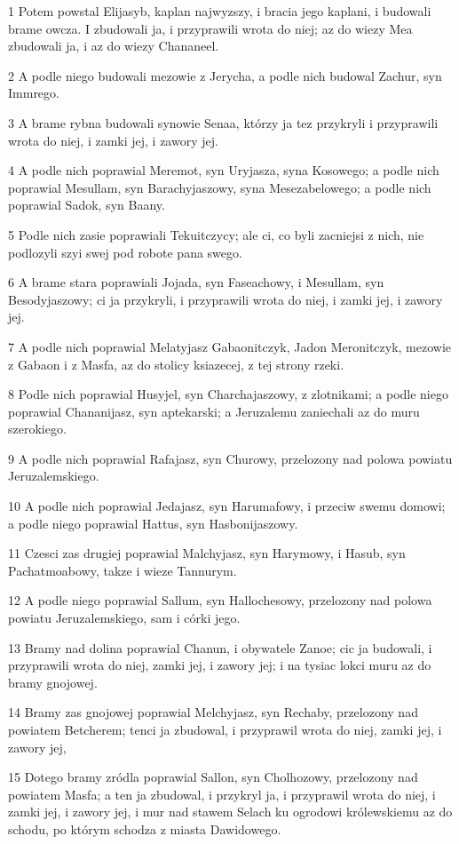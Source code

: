 \par 1 Potem powstal Elijasyb, kaplan najwyzszy, i bracia jego kaplani, i budowali brame owcza. I zbudowali ja, i przyprawili wrota do niej; az do wiezy Mea zbudowali ja, i az do wiezy Chananeel.
\par 2 A podle niego budowali mezowie z Jerycha, a podle nich budowal Zachur, syn Immrego.
\par 3 A brame rybna budowali synowie Senaa, którzy ja tez przykryli i przyprawili wrota do niej, i zamki jej, i zawory jej.
\par 4 A podle nich poprawial Meremot, syn Uryjasza, syna Kosowego; a podle nich poprawial Mesullam, syn Barachyjaszowy, syna Mesezabelowego; a podle nich poprawial Sadok, syn Baany.
\par 5 Podle nich zasie poprawiali Tekuitczycy; ale ci, co byli zacniejsi z nich, nie podlozyli szyi swej pod robote pana swego.
\par 6 A brame stara poprawiali Jojada, syn Faseachowy, i Mesullam, syn Besodyjaszowy; ci ja przykryli, i przyprawili wrota do niej, i zamki jej, i zawory jej.
\par 7 A podle nich poprawial Melatyjasz Gabaonitczyk, Jadon Meronitczyk, mezowie z Gabaon i z Masfa, az do stolicy ksiazecej, z tej strony rzeki.
\par 8 Podle nich poprawial Husyjel, syn Charchajaszowy, z zlotnikami; a podle niego poprawial Chananijasz, syn aptekarski; a Jeruzalemu zaniechali az do muru szerokiego.
\par 9 A podle nich poprawial Rafajasz, syn Churowy, przelozony nad polowa powiatu Jeruzalemskiego.
\par 10 A podle nich poprawial Jedajasz, syn Harumafowy, i przeciw swemu domowi; a podle niego poprawial Hattus, syn Hasbonijaszowy.
\par 11 Czesci zas drugiej poprawial Malchyjasz, syn Harymowy, i Hasub, syn Pachatmoabowy, takze i wieze Tannurym.
\par 12 A podle niego poprawial Sallum, syn Hallochesowy, przelozony nad polowa powiatu Jeruzalemskiego, sam i córki jego.
\par 13 Bramy nad dolina poprawial Chanun, i obywatele Zanoe; cic ja budowali, i przyprawili wrota do niej, zamki jej, i zawory jej; i na tysiac lokci muru az do bramy gnojowej.
\par 14 Bramy zas gnojowej poprawial Melchyjasz, syn Rechaby, przelozony nad powiatem Betcherem; tenci ja zbudowal, i przyprawil wrota do niej, zamki jej, i zawory jej,
\par 15 Dotego bramy zródla poprawial Sallon, syn Cholhozowy, przelozony nad powiatem Masfa; a ten ja zbudowal, i przykryl ja, i przyprawil wrota do niej, i zamki jej, i zawory jej, i mur nad stawem Selach ku ogrodowi królewskiemu az do schodu, po którym schodza z miasta Dawidowego.
